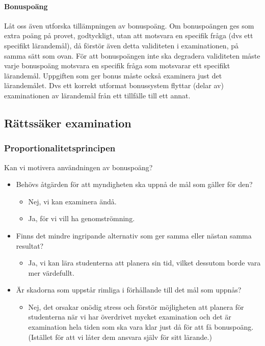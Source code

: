 \paragraph{Bonuspoäng}

Låt oss även utforska tillämpningen av bonuspoäng. Om bonuspoängen ges
som extra poäng på provet, godtyckligt, utan att motsvara en specifik
fråga (dvs ett specifikt lärandemål), då förstör även detta validiteten
i examinationen, på samma sätt som ovan. För att bonuspoängen inte ska
degradera validiteten måste varje bonuspoäng motsvara en specifik fråga
som motsvarar ett specifikt lärandemål. Uppgiften som ger bonus måste
också examinera just det lärandemålet. Dvs ett korrekt utformat
bonussystem flyttar (delar av) examinationen av lärandemål från ett
tillfälle till ett annat.

\subsection{Rättssäker examination}\label{rättssäker-examination}

\subsubsection{Proportionalitetsprincipen}\label{proportionalitetsprincipen}

Kan vi motivera användningen av bonuspoäng?

\begin{itemize}
\item
  Behövs åtgärden för att myndigheten ska uppnå de mål som gäller för
  den?

  \begin{itemize}
  \item
    Nej, vi kan examinera ändå.
  \item
    Ja, för vi vill ha genomströmning.
  \end{itemize}
\item
  Finns det mindre ingripande alternativ som ger samma eller nästan
  samma resultat?

  \begin{itemize}
  \item
    Ja, vi kan lära studenterna att planera sin tid, vilket dessutom
    borde vara mer värdefullt.
  \end{itemize}
\item
  Är skadorna som uppstår rimliga i förhållande till det mål som uppnås?

  \begin{itemize}
  \item
    Nej, det orsakar onödig stress och förstör möjligheten att planera
    för studenterna när vi har överdrivet mycket examination och det är
    examination hela tiden som ska vara klar just då för att få
    bonuspoäng. (Istället för att vi låter dem ansvara själv för sitt
    lärande.)
  \end{itemize}
\end{itemize}

